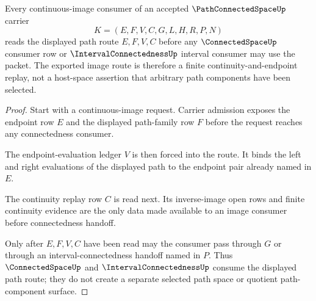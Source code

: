\begin{theorem}
\label{thm:path-connected-space-continuous-image-route}
Every continuous-image consumer of an accepted $\PathConnectedSpaceUp$ carrier
$$
K=(E,F,V,C,G,L,H,R,P,N)
$$
reads the displayed path route $E,F,V,C$ before any $\ConnectedSpaceUp$ consumer row or $\IntervalConnectednessUp$ interval consumer may use the packet. The exported image route is therefore a finite continuity-and-endpoint replay, not a host-space assertion that arbitrary path components have been selected.
\end{theorem}
\begin{proof}
Start with a continuous-image request. Carrier admission exposes the endpoint row $E$ and the displayed path-family row $F$ before the request reaches any connectedness consumer.

The endpoint-evaluation ledger $V$ is then forced into the route. It binds the left and right evaluations of the displayed path to the endpoint pair already named in $E$.

The continuity replay row $C$ is read next. Its inverse-image open rows and finite continuity evidence are the only data made available to an image consumer before connectedness handoff.

Only after $E,F,V,C$ have been read may the consumer pass through $G$ or through an interval-connectedness handoff named in $P$. Thus $\ConnectedSpaceUp$ and $\IntervalConnectednessUp$ consume the displayed path route; they do not create a separate selected path space or quotient path-component surface.
\end{proof}


\begin{closurestatus}{\PathConnectedSpaceUp}
  \theoryclosure{\seedClosure}
  \formalstatus{\theoremCheckedV}
\end{closurestatus}
